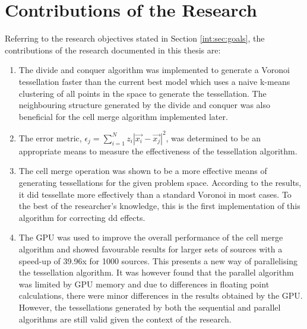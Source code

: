 \section{Contributions of the Research}
Referring to the research objectives stated in Section \ref{int:sec:goals}, the contributions of the research documented in this thesis are:
\begin{enumerate}
\item The divide and conquer algorithm was implemented to generate a Voronoi tessellation faster than the current best model which uses a naive k-means clustering of all points in the space to generate the tessellation. The neighbouring structure generated by the divide and conquer was also beneficial for the cell merge algorithm implemented later.
\item The error metric, $\epsilon_j = \sum^N_{i=1} z_i|\vec{x_i} - \vec{x_j}|^2$, was determined to be an appropriate means to measure the effectiveness of the tessellation algorithm.
\item The cell merge operation was shown to be a more effective means of generating tessellations for the given problem space. According to the results, it did tessellate more effectively than a standard Voronoi in most cases. To the best of the researcher's knowledge, this is the first implementation of this algorithm for correcting \gls{dd} effects.
\item The GPU was used to improve the overall performance of the cell merge algorithm and showed favourable results for larger sets of sources with a speed-up of 39.96x for 1000 sources. This presents a new way of parallelising the tessellation algorithm. It was however found that the parallel algorithm was limited by GPU memory and due to differences in floating point calculations, there were minor differences in the results obtained by the GPU. However, the tessellations generated by both the sequential and parallel algorithms are still valid given the context of the research.
\end{enumerate}
